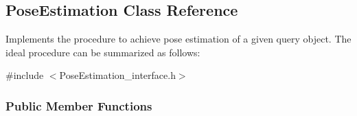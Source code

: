 \hypertarget{classPoseEstimation}{\subsection{Pose\-Estimation Class Reference}
\label{classPoseEstimation}
}


Implements the procedure to achieve pose estimation of a given query object. The ideal procedure can be summarized as follows\-:  




{\ttfamily \#include $<$Pose\-Estimation\-\_\-interface.\-h$>$}

\subsubsection*{Public Member Functions}

